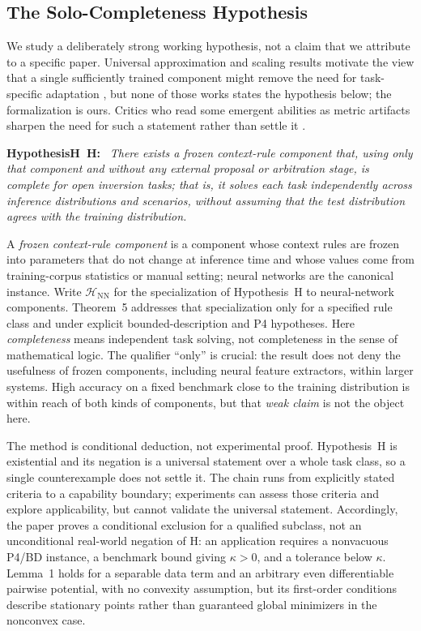 \documentclass[twoside,11pt]{article}
\newenvironment{hyp}[1][]{\par\medskip\noindent\textbf{Hypothesis\ifx\relax#1\relax\else\ #1\fi:}\ \itshape}{\par\medskip} %
\begin{document}
\subsection{The Solo-Completeness Hypothesis}

We study a deliberately strong working hypothesis, not a claim that we attribute to a specific paper. Universal approximation and scaling results motivate the view that a single sufficiently trained component might remove the need for task-specific adaptation \citep{cybenko1989,hornik1989,bubeck2023,kaplan2020,brown2020}, but none of those works states the hypothesis below; the formalization is ours. Critics who read some emergent abilities as metric artifacts sharpen the need for such a statement rather than settle it \citep{schaeffer2023}.

\begin{hyp}[H]
There exists a frozen context-rule component that, using only that component and without any external proposal or arbitration stage, is complete for open inversion tasks; that is, it solves each task independently across inference distributions and scenarios, without assuming that the test distribution agrees with the training distribution.
\end{hyp}

A \emph{frozen context-rule component} is a component whose context rules are frozen into parameters that do not change at inference time and whose values come from training-corpus statistics or manual setting; neural networks are the canonical instance. Write $\mathcal{H}_{\mathrm{NN}}$ for the specialization of Hypothesis~H to neural-network components. Theorem~5 addresses that specialization only for a specified rule class and under explicit bounded-description and P4 hypotheses. Here \emph{completeness} means independent task solving, not completeness in the sense of mathematical logic. The qualifier ``only'' is crucial: the result does not deny the usefulness of frozen components, including neural feature extractors, within larger systems. High accuracy on a fixed benchmark close to the training distribution is within reach of both kinds of components, but that \emph{weak claim} is not the object here.

The method is conditional deduction, not experimental proof. Hypothesis~H is existential and its negation is a universal statement over a whole task class, so a single counterexample does not settle it. The chain runs from explicitly stated criteria to a capability boundary; experiments can assess those criteria and explore applicability, but cannot validate the universal statement. Accordingly, the paper proves a conditional exclusion for a qualified subclass, not an unconditional real-world negation of H: an application requires a nonvacuous P4/BD instance, a benchmark bound giving $\kappa>0$, and a tolerance below $\kappa$. Lemma~1 holds for a separable data term and an arbitrary even differentiable pairwise potential, with no convexity assumption, but its first-order conditions describe stationary points rather than guaranteed global minimizers in the nonconvex case.
\end{document}
